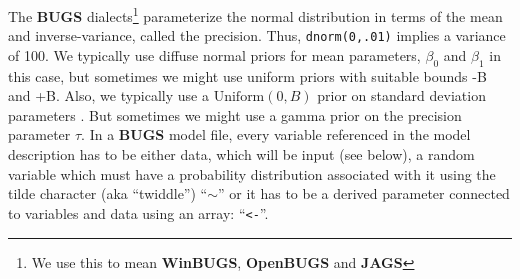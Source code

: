 The {\bf BUGS} dialects\footnote{We use this to mean {\bf WinBUGS},
  {\bf OpenBUGS} and {\bf JAGS}} parameterize the normal distribution
in terms of the mean and inverse-variance, called the precision. Thus,
\mbox{\tt dnorm(0,.01)} implies a variance of 100.  We typically use
diffuse normal priors for mean parameters, $\beta_0$ and $\beta_1$ in
this case, but sometimes we might use uniform priors with suitable
bounds -B and +B.  Also, we typically use a $\text{Uniform}(0,B)$
prior on standard deviation parameters \citep{gelman:2006}.  But
sometimes we might use a gamma prior on the precision parameter
$\tau$.  In a {\bf BUGS} model file, every variable referenced in the
model description has to be either data, which will be input (see
below), a random variable which must have a probability distribution
associated with it using the tilde character (aka ``twiddle'')
``$\sim$'' or it has to be a derived parameter connected to variables
and data using an array: ``\mbox{\tt <-}''.


